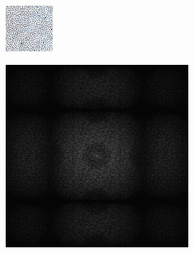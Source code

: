 \begin{figure}[H]
\begin{tcolorbox}[boxrule=4pt,sharp corners=downhill,title=Sortieren]
\begin{subfigure}[b]{0.2\textwidth}
        \includegraphics[width=\textwidth]{content/TemporalerAlg/Bilder/Sorting/Ausschnitte/Ausschnitt7.png}
        \label{pic:sorting_t7}
    \end{subfigure}
    \begin{subfigure}[b]{0.2\textwidth}
        \centering
        \includegraphics[width=\textwidth]{content/TemporalerAlg/Bilder/Sorting/Spektren/Ausschnitt7.png}

\end{subfigure}
\end{tcolorbox}
\end{figure}
